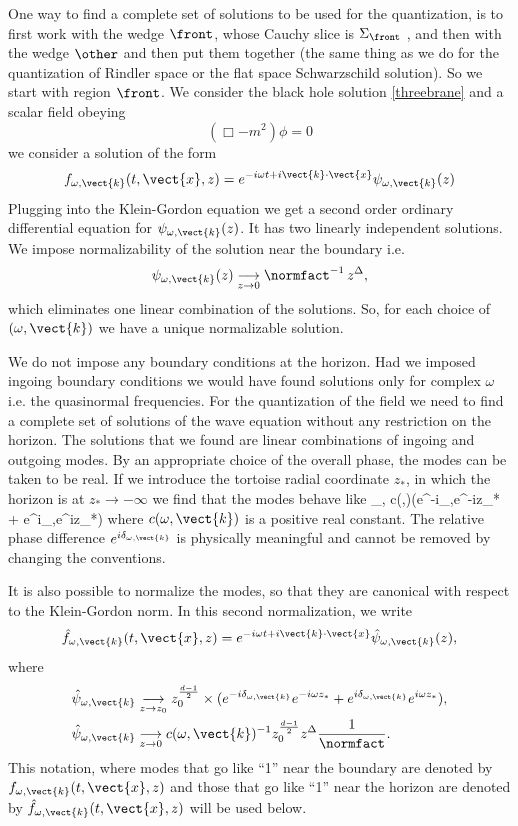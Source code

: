 One way to find a complete set of solutions to be used for the quantization, is to first work with the wedge $\front$, whose Cauchy slice is $\Sigma_{\front}$ , and then with the wedge $\other$ and then put them together (the same thing as we do for the quantization of Rindler space or the flat space Schwarzschild solution). So we start with region $\front$.
We consider the black hole solution \eqref{threebrane} and a scalar field obeying
\[
(\Box - m^2) \phi =0 
\]
we consider a solution of the form
\[
f_{\omega,\vect{k}}(t,\vect{x},z) = e^{-i \omega t + i \vect{k} \cdot \vect{x}} \psi_{\omega,\vect{k}}(z)
\]
Plugging into the Klein-Gordon equation we get a second order ordinary differential equation for $\psi_{\omega,\vect{k}}(z)$. 
It has two linearly independent solutions. We impose normalizability of the solution near the boundary i.e.
\[
\psi_{\omega, \vect{k}} (z) \underset{z \rightarrow 0}{\longrightarrow} \normfact^{-1}\,z^{\Delta},
\]
which eliminates one linear combination of the solutions. So, for each choice of $(\omega,\vect{k})$ we have a unique normalizable solution.

We do not impose any boundary conditions at the horizon. Had we imposed ingoing boundary conditions we would have found solutions only for complex $\omega$ i.e. 
the quasinormal frequencies. For the quantization of the field we need to find a complete set of solutions of the wave equation without any restriction on the horizon. 
The solutions that we found are linear combinations of ingoing and outgoing modes. By an appropriate choice of the overall phase, the modes can be taken to be real. 
If we introduce the tortoise radial coordinate $z_*$, in which the horizon is at $z_*\rightarrow - \infty$ we find that the modes behave like
\be
\label{nearhpsi}
\psi_{\omega,} c(\omega,)\left(e^{-i\delta_{\omega,}}e^{-i\omega z_*} + e^{i\delta_{\omega,}}e^{i\omega z_*}\right)
\ee
where $c(\omega,\vect{k})$ is a positive real constant.
The relative phase difference $e^{i\delta_{\omega,\vect{k}}}$ is physically meaningful and cannot be removed by changing the conventions.

 
It is also possible to normalize the modes, so that they are canonical
with respect to the Klein-Gordon norm. In this second normalization, we write
\[
\hat{f}_{\omega,\vect{k}}(t,\vect{x},z) = e^{-i \omega t + i \vect{k} \cdot \vect{x}} \hat{\psi}_{\omega,\vect{k}}(z),
\]
where
\[
\begin{split}
&\hat{\psi}_{\omega, \vect{k}} \underset{z \rightarrow z_0}{\longrightarrow} z_0^{d-1 \over 2} \times (e^{-i\delta_{\omega,\vect{k}}}e^{-i\omega z_*} + e^{i\delta_{\omega,\vect{k}}}e^{ i\omega z_* }),\\
&\hat{\psi}_{\omega, \vect{k}} \underset{z \rightarrow 0}{\longrightarrow} c(\omega,\vect{k})^{-1} z_0^{{d-1 \over 2}} z^{\Delta} {1 \over \normfact}.
\end{split}
\]
This notation, where modes that go like ``1'' near the boundary are denoted by  $f_{\omega,\vect{k}}(t,\vect{x},z)$ and those that go like ``1'' near the horizon are denoted by $\hat{f}_{\omega,\vect{k}}(t,\vect{x},z)$ will be used below.

